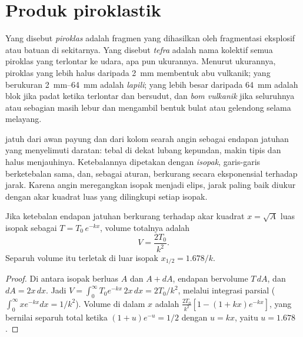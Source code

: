 \section{Produk piroklastik}

\begin{definition}\label{def:b2:eruptive-styles:tephra}
Yang disebut \emph{piroklas} adalah fragmen yang dihasilkan oleh
fragmentasi eksplosif  atau batuan di sekitarnya. Yang disebut \emph{tefra} adalah
nama kolektif semua piroklas yang terlontar ke udara, apa pun ukurannya.
Menurut ukurannya, piroklas yang lebih halus daripada \qty{2}{mm} membentuk abu vulkanik; yang berukuran
\qtyrange{2}{64}{mm} adalah \emph{lapili}; yang lebih besar daripada
\qty{64}{mm} adalah blok jika padat ketika terlontar dan bersudut, dan
\emph{bom vulkanik} jika seluruhnya atau sebagian masih lebur
dan mengambil bentuk bulat atau gelendong selama melayang.
\end{definition}

 jatuh dari awan payung dan dari kolom searah angin sebagai endapan jatuhan
yang menyelimuti daratan: tebal di dekat lubang kepundan, makin tipis dan halus menjauhinya.
Ketebalannya dipetakan dengan \emph{isopak}, garis-garis berketebalan sama, dan, sebagai aturan,
berkurang secara eksponensial terhadap jarak. Karena angin meregangkan isopak
menjadi elips, jarak paling baik diukur dengan akar kuadrat luas yang dilingkupi setiap
isopak.

\begin{proposition}\label{prop:b2:eruptive-styles:thinning}
Jika ketebalan endapan jatuhan berkurang terhadap akar kuadrat $x = \sqrt A$
luas isopak sebagai $T = T_0\,e^{-kx}$, volume totalnya adalah
\[
V = \frac{2T_0}{k^2}.
\]
Separuh volume itu terletak di luar isopak $x_{1/2} = 1.678/k$.
\end{proposition}

\begin{proof}
Di antara isopak berluas $A$ dan $A + dA$, endapan bervolume $T\,dA$,
dan $dA = 2x\,dx$. Jadi $V = \int_0^\infty T_0e^{-kx}\,2x\,dx = 2T_0/k^2$, melalui
integrasi parsial ($\int_0^\infty xe^{-kx}dx = 1/k^2$). Volume di dalam $x$
adalah $\frac{2T_0}{k^2}[1 - (1 + kx)e^{-kx}]$, yang bernilai separuh total ketika $(1 +
u)e^{-u} = 1/2$ dengan $u = kx$, yaitu $u = 1.678$.
\end{proof}

